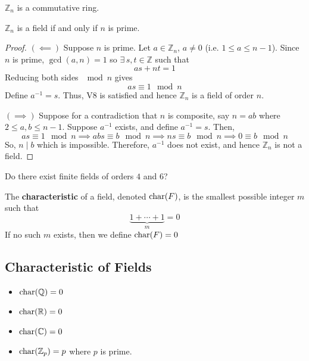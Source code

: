 \begin{thmbox}
    \begin{theorem}
    $ \mathbb{Z}_n $ is a commutative ring.
\end{theorem} \end{thmbox}

\begin{thmbox}
    \begin{theorem}
    $ \mathbb{Z}_n $ is a field if and only if $ n $ is prime.
\end{theorem} \end{thmbox}

\begin{proof}
    $ (\impliedby) $ Suppose $ n $ is prime. Let $ a\in\mathbb{Z}_n $, $ a\neq 0 $
    (i.e. $ 1\leqslant a\leqslant n-1 $). Since $ n $ is prime, $ \gcd(a,n)=1 $
    so $ \exists\,s,t\in\mathbb{Z} $ such that
    \[ as+nt=1 \]
    Reducing both sides $ \mod n $ gives
    \[ as\equiv 1 \mod n \]
    Define $ a^{-1}=s $. Thus, V8 is satisfied and hence $ \mathbb{Z}_n $
    is a field of order $ n $.

    $ (\implies) $ Suppose for a contradiction that $ n $ is composite, say $ n=ab $
    where $ 2\leqslant a,b\leqslant n-1 $. Suppose $ a^{-1} $ exists, and define
    $ a^{-1}=s $. Then,
    \[ as\equiv 1 \mod n\implies abs\equiv b\mod n\implies ns\equiv b \mod n
    \implies 0\equiv b\mod n \]
    So, $ n\mid b $ which is impossible. Therefore, $ a^{-1} $ does not exist, and hence
    $ \mathbb{Z}_n $ is not a field.
\end{proof}

 Do there exist finite fields of orders $ 4 $ and $ 6 $?

\begin{defbox}
    \begin{definition}
    The \textbf{characteristic} of a field, denoted $ \operatorname{char}(F) $, is the smallest
    possible integer $ m $ such that
    \[ \underbrace{1+\cdots+1}_{m}=0 \]
    If no such $ m $ exists, then we define $ \operatorname{char}(F)=0 $
\end{definition} \end{defbox}

\begin{exbox}
    \subsection{Characteristic of Fields}
    \begin{itemize}
        \item $ \operatorname{char}(\mathbb{Q})=0 $
        \item $ \operatorname{char}(\mathbb{R})=0 $
        \item $ \operatorname{char}(\mathbb{C})=0 $
        \item $ \operatorname{char}(\mathbb{Z}_p)=p $ where $ p $ is prime.
    \end{itemize}
\end{exbox}

